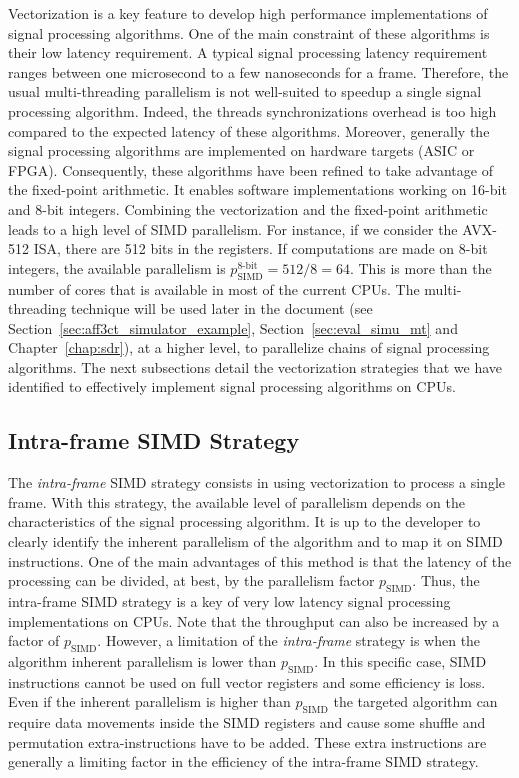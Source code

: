 Vectorization is a key feature to develop high performance implementations of
signal processing algorithms. One of the main constraint of these algorithms is
their low latency requirement. A typical signal processing latency requirement
ranges between one microsecond to a few nanoseconds for a frame. Therefore, the
usual multi-threading parallelism is not well-suited to speedup a single signal
processing algorithm. Indeed, the threads synchronizations overhead is too high
compared to the expected latency of these algorithms. Moreover, generally the
signal processing algorithms are implemented on hardware targets (ASIC or FPGA).
Consequently, these algorithms have been refined to take advantage of the
fixed-point arithmetic. It enables software implementations working on 16-bit
and 8-bit integers. Combining the vectorization and the fixed-point arithmetic
leads to a high level of SIMD parallelism. For instance, if we consider the
AVX-512 ISA, there are 512 bits in the registers. If computations are made on
8-bit integers, the available parallelism is $p^\text{8-bit}_\text{SIMD} = 512 /
8 = 64$. This is more than the number of cores that is available in most of the
current CPUs. The multi-threading technique will be used later in the document
(see Section~\ref{sec:aff3ct_simulator_example}, Section~\ref{sec:eval_simu_mt}
and Chapter~\ref{chap:sdr}), at a higher level, to parallelize chains of signal
processing algorithms. The next subsections detail the vectorization strategies
that we have identified to effectively implement signal processing algorithms on
CPUs.

\subsection{Intra-frame SIMD Strategy}
\label{sec:opt_vec_intra}

The \emph{intra-frame} SIMD strategy consists in using vectorization to process
a single frame. With this strategy, the available level of parallelism depends
on the characteristics of the signal processing algorithm. It is up to the
developer to clearly identify the inherent parallelism of the algorithm and to
map it on SIMD instructions. One of the main advantages of this method is that
the latency of the processing can be divided, at best, by the parallelism factor
$p_\text{SIMD}$. Thus, the intra-frame SIMD strategy is a key of very low
latency signal processing implementations on CPUs. Note that the throughput can
also be increased by a factor of $p_\text{SIMD}$. However, a limitation of the
\emph{intra-frame} strategy is when the algorithm inherent parallelism is lower
than $p_\text{SIMD}$. In this specific case, SIMD instructions cannot be used on
full vector registers and some efficiency is loss. Even if the inherent
parallelism is higher than $p_\text{SIMD}$ the targeted algorithm can require
data movements inside the SIMD registers and cause some shuffle and permutation
extra-instructions have to be added. These extra instructions are generally a
limiting factor in the efficiency of the intra-frame SIMD strategy.

